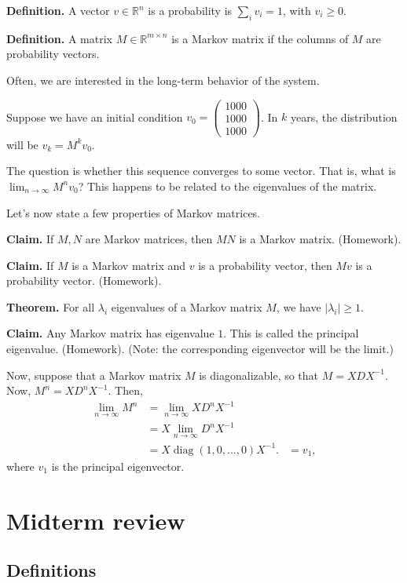 \documentclass{article}
\newcommand{\mat}[1]{\begin{pmatrix}#1\end{pmatrix}}
\newcommand{\RR}{\mathbb{R}}
\DeclareMathOperator{\diag}{diag}
\begin{document}
{\bf Definition.} A vector $v \in \RR^n$ is a probability is $\sum_i v_i = 1$, with $v_i \geq 0$.

{\bf Definition.} A matrix $M \in \RR^{m \times n}$ is a Markov matrix if the columns of $M$ are probability vectors.

Often, we are interested in the long-term behavior of the system.

Suppose we have an initial condition $v_0 = \mat{1000 \\ 1000 \\ 1000}$.  In $k$ years, the distribution will be $v_k = M^k v_0$.

The question is whether this sequence converges to some vector.  That is, what is $\lim_{n \to \infty} M^n v_0$?  This happens to be related to the eigenvalues of the matrix.

Let's now state a few properties of Markov matrices.

{\bf Claim.} If $M, N$ are Markov matrices, then $M N$ is a Markov matrix.  (Homework).

{\bf Claim.} If $M$ is a Markov matrix and $v$ is a probability vector, then $Mv$ is a probability vector. (Homework).

{\bf Theorem.} For all $\lambda_i$ eigenvalues of a Markov matrix $M$, we have $|\lambda_i| \geq 1$.

{\bf Claim.} Any Markov matrix has eigenvalue $1$.  This is called the principal eigenvalue. (Homework).  (Note: the corresponding eigenvector will be the limit.)

Now, suppose that a Markov matrix $M$ is diagonalizable, so that $M = X D X^{-1}$.  Now, $M^n = X D^n X^{-1}$.  Then,
\begin{align*}
  \lim_{n \to \infty} M^n &= \lim_{n \to \infty} X D^n X^{-1} \\
  &= X \lim_{n \to \infty} D^n X^{-1} \\
  &= X \diag(1, 0, \dots, 0) X^{-1}.
  &= v_1,
\end{align*}
where $v_1$ is the principal eigenvector.


\section{Midterm review}

\subsection{Definitions}
\end{document}
